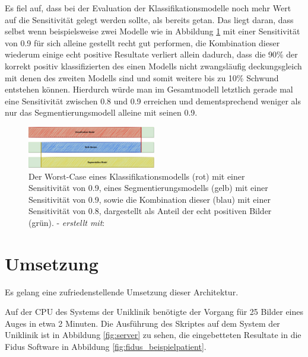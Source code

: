 Es fiel auf, dass bei der Evaluation der Klassifikationsmodelle noch mehr Wert auf die Sensitivität gelegt werden sollte, als bereits getan. Das liegt daran, dass selbst wenn beispielsweise zwei Modelle wie in Abbildung \ref{pic:Prefilter_TP} mit einer Sensitivität von 0.9 für sich alleine gestellt recht gut performen, die Kombination dieser wiederum einige echt positive Resultate verliert allein dadurch, dass die 90\% der korrekt positiv klassifizierten des einen Modells nicht zwangsläufig deckungsgleich mit denen des zweiten Modells sind und somit weitere bis zu 10\% Schwund entstehen können. Hierdurch würde man im Gesamtmodell letztlich gerade mal eine Sensitivität zwischen 0.8 und 0.9 erreichen und dementsprechend weniger als nur das Segmentierungsmodell alleine mit seinen 0.9.

\begin{figure}[H]
\centering
\includegraphics[width=0.5\textwidth]{./pic/Prototyp/prefilter.png}
\caption{\label{pic:Prefilter_TP}Der Worst-Case eines Klassifikationsmodells (rot) mit einer Sensitivität von 0.9, eines Segmentierungsmodells (gelb) mit einer Sensitivität von 0.9, sowie die Kombination dieser (blau) mit einer Sensitivität von 0.8, dargestellt als Anteil der echt positiven Bilder (grün). - \textit{erstellt mit}: \cite{23}}
\end{figure}

\section{Umsetzung}

Es gelang eine zufriedenstellende Umsetzung dieser Architektur.

Auf der CPU des Systems der Uniklinik benötigte der Vorgang für 25 Bilder eines Auges in etwa 2 Minuten. Die Ausführung des Skriptes auf dem System der Uniklinik ist in Abbildung \ref{fig:server} zu sehen, die eingebetteten Resultate in die Fidus Software in Abbildung \ref{fig:fidus_beispielpatient}.

